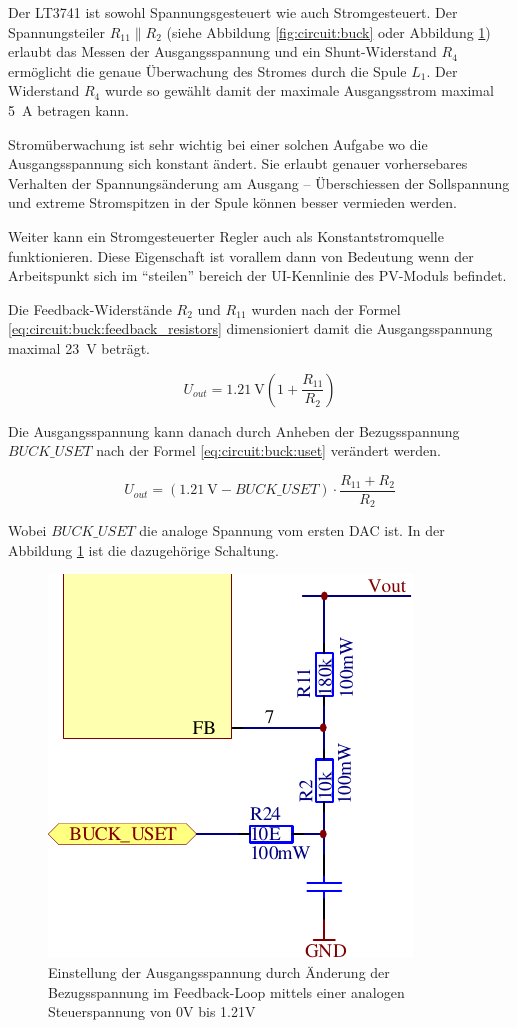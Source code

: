 

Der  LT3741  ist  sowohl   Spannungsgesteuert   wie   auch  Stromgesteuert.  Der
Spannungsteiler  $R_{11} \parallel R_2$ (siehe Abbildung  \ref{fig:circuit:buck}
oder    Abbildung    \ref{fig:circuit:buck:uset})   erlaubt   das   Messen   der
Ausgangsspannung  und  ein  Shunt-Widerstand  $R_4$   erm\"oglicht   die  genaue
\"Uberwachung des Stromes durch die Spule  $L_1$.  Der Widerstand $R_4$ wurde so
gew\"ahlt damit der  maximale  Ausgangsstrom  maximal  \SI{5}{\ampere}  betragen
kann.

Strom\"uberwachung   ist  sehr  wichtig  bei  einer  solchen  Aufgabe   wo   die
Ausgangsspannung  sich  konstant  \"andert.  Sie erlaubt  genauer  vorhersebares
Verhalten der Spannungs\"anderung am Ausgang -- \"Uberschiessen der Sollspannung
und  extreme  Stromspitzen  in  der  Spule  k\"onnen  besser  vermieden  werden.

Weiter   kann   ein   Stromgesteuerter   Regler  auch  als   Konstantstromquelle
funktionieren. Diese Eigenschaft  ist  vorallem  dann  von  Bedeutung  wenn  der
Arbeitspunkt  sich  im  ``steilen''  bereich  der   UI-Kennlinie  des  PV-Moduls
befindet.

Die  Feedback-Widerst\"ande   $R_2$   und   $R_{11}$   wurden  nach  der  Formel
\ref{eq:circuit:buck:feedback_resistors}       dimensioniert      damit      die
Ausgangsspannung maximal \SI{23}{\volt} betr\"agt.

\begin{equation}
    U_{out} = \SI{1.21}{\volt} \left( 1 + \frac{R_{11}}{R_2} \right)
    \label{eq:circuit:buck:feedback_resistors}
\end{equation}

Die Ausgangsspannung kann  danach  durch Anheben der Bezugsspannung $BUCK\_USET$
nach der  Formel \ref{eq:circuit:buck:uset} ver\"andert werden. 

\begin{equation}
    U_{out} = (\SI{1.21}{\volt} - BUCK\_USET) \cdot \frac{R_{11} + R_2}{R_2}
    \label{eq:circuit:buck:uset}
\end{equation}

Wobei $BUCK\_USET$ die analoge Spannung vom  ersten  DAC  ist.  In der Abbildung
\ref{fig:circuit:buck:uset} ist die dazugeh\"orige Schaltung.

\begin{figure}[th!]
    \center
    \includegraphics[width=.35\textwidth]{images/circuit/buck-uset.pdf}
    \caption{Einstellung der Ausgangsspannung durch \"Anderung der Bezugsspannung im Feedback-Loop mittels einer analogen Steuerspannung von 0V bis 1.21V}
    \label{fig:circuit:buck:uset}
\end{figure}

